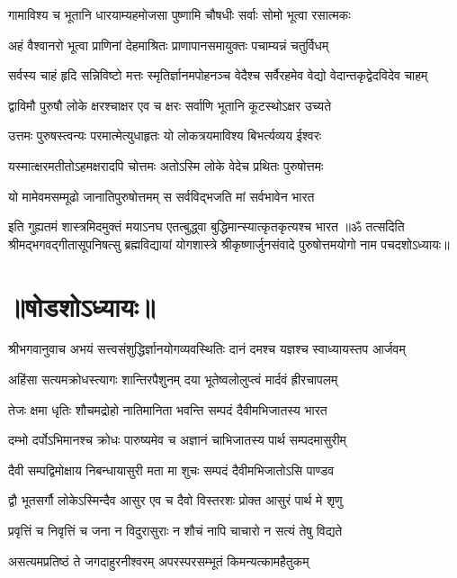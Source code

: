 \twolineshloka
{गामाविश्य च भूतानि धारयाम्यहमोजसा}
{पुष्णामि चौषधीः सर्वाः सोमो भूत्वा रसात्मकः}%

\twolineshloka
{अहं वैश्वानरो भूत्वा प्राणिनां देहमाश्रितः}
{प्राणापानसमायुक्तः पचाम्यन्नं चतुर्विधम्}%

\fourlineindentedshloka
{सर्वस्य चाहं हृदि सन्निविष्टो}
{मत्तः स्मृतिर्ज्ञानमपोहनञ्च}
{वेदैश्च सर्वैरहमेव वेद्यो}
{वेदान्तकृद्वेदविदेव चाहम्}%

\twolineshloka
{द्वाविमौ पुरुषौ लोके क्षरश्चाक्षर एव च}
{क्षरः सर्वाणि भूतानि कूटस्थोऽक्षर उच्यते}%

\twolineshloka
{उत्तमः पुरुषस्त्वन्यः परमात्मेत्युधाहृतः}
{यो लोकत्रयमाविश्य बिभर्त्यव्यय ईश्वरः}%

\twolineshloka
{यस्मात्क्षरमतीतोऽहमक्षरादपि चोत्तमः}
{अतोऽस्मि लोके वेदेच प्रथितः पुरुषोत्तमः}%

\twolineshloka
{यो मामेवमसम्मूढो जानातिपुरुषोत्तमम्}
{स सर्वविद्भजति मां सर्वभावेन भारत}%

\twolineshloka
{इति गुह्यतमं शास्त्रमिदमुक्तं मयाऽनघ}
{एतत्बुद्ध्वा बुद्धिमान्स्यात्कृतकृत्यश्च भारत}%
{॥ॐ तत्सदिति श्रीमद्भगवद्गीतासूपनिषत्सु ब्रह्मविद्यायां योगशास्त्रे श्रीकृष्णार्जुनसंवादे पुरुषोत्तमयोगो नाम पचदशोऽध्यायः॥}

\section{॥षोडशोऽध्यायः॥}
{श्रीभगवानुवाच}
\twolineshloka
{अभयं सत्त्वसंशुद्धिर्ज्ञानयोगव्यवस्थितिः}
{दानं दमश्च यज्ञश्च स्वाध्यायस्तप आर्जवम्}%

\twolineshloka
{अहिंसा सत्यमक्रोधस्त्यागः शान्तिरपैशुनम्}
{दया भूतेष्वलोलुप्त्वं मार्दवं ह्रीरचापलम्}%

\twolineshloka
{तेजः क्षमा धृतिः शौचमद्रोहो नातिमानिता}
{भवन्ति सम्पदं दैवीमभिजातस्य भारत}%

\twolineshloka
{दम्भो दर्पोऽभिमानश्च क्रोधः पारुष्यमेव च}
{अज्ञानं चाभिजातस्य पार्थ सम्पदमासुरीम्}%

\twolineshloka
{दैवी सम्पद्विमोक्षाय निबन्धायासुरी मता}
{मा शुचः सम्पदं दैवीमभिजातोऽसि पाण्डव}%

\twolineshloka
{द्वौ भूतसर्गौ लोकेऽस्मिन्दैव आसुर एव च}
{दैवो विस्तरशः प्रोक्त आसुरं पार्थ मे शृणु}%

\twolineshloka
{प्रवृत्तिं च निवृत्तिं च जना न विदुरासुराः}
{न शौचं नापि चाचारो न सत्यं तेषु विद्यते}%

\twolineshloka
{असत्यमप्रतिष्ठं ते जगदाहुरनीश्वरम्}
{अपरस्परसम्भूतं किमन्यत्कामहैतुकम्}%

